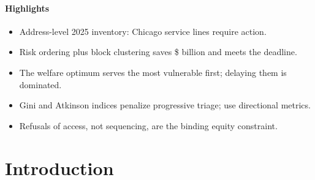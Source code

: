 \documentclass[11pt]{article}
\begin{document}
\begin{abstract}
in EJ zones. Replacement passes a benefit--cost test in every benefit tier and discount rate
examined (BCR \BCRChildThirtyOneSeven{} to \BCRHighThirtyOneTwo{} at \$31,000).
\textbf{Policy.} We propose four ordinances: mandatory replacement with right of entry; zero-cost
replacement with an affordability rider; algorithmic transparency with a directional equity audit;
and unit-cost benchmarking with local hiring.
\par\medskip\noindent\textbf{Keywords:} lead service lines; environmental justice; mixed-integer
linear programming; cost--benefit analysis; social discount rate; split incentives;
infrastructure equity; Chicago
\end{abstract}

\paragraph{Highlights}
\begin{itemize}[nosep,leftmargin=1.2em]
\item Address-level 2025 inventory: \NAction{} Chicago service lines require action.
\item Risk ordering plus block clustering saves \$\DecTotal{} billion and meets the deadline.
\item The welfare optimum serves the most vulnerable first; delaying them is dominated.
\item Gini and Atkinson indices penalize progressive triage; use directional metrics.
\item Refusals of access, not sequencing, are the binding equity constraint.
\end{itemize}

\medskip\noindent{}

\section{Introduction}\label{sec:intro}
\end{document}
